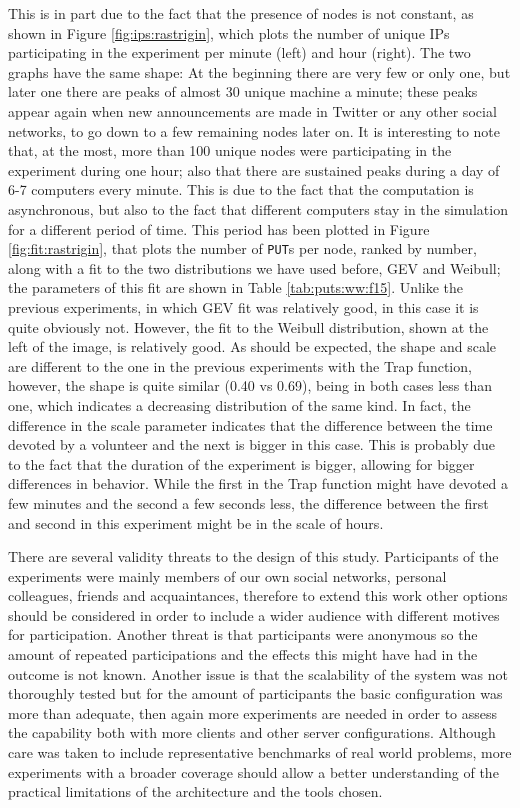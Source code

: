 \documentclass[journal,onecolumn]{IEEEtran}
\begin{document}
This is in part due to the fact that the presence of nodes is not
constant, as shown in Figure \ref{fig:ips:rastrigin}, which plots the
number of unique IPs participating in the experiment per minute (left)
and hour (right). The two graphs have the same shape: At the beginning there are very few or only
one, but later one there are peaks of almost 30 unique machine a
minute; these peaks appear again when new announcements are made in
Twitter or any other social networks, to go down to a few remaining
nodes later on. It is interesting to note that, at the most, more than
100 unique nodes were participating in the experiment during one hour;
also that there are sustained peaks during a day of 6-7 computers
every minute. This is due to the fact that the computation is
asynchronous, but also to the fact that different computers stay in
the simulation for a different period of time. This period has been
plotted in Figure \ref{fig:fit:rastrigin}, that plots the number of
{\tt PUT}s per node, ranked by number, along with a fit to the two
distributions we have used before, GEV and Weibull; the parameters of
this fit are shown in Table \ref{tab:puts:ww:f15}. Unlike the previous
experiments, in which GEV fit was relatively good, in this case it is
quite obviously not. However, the fit to the Weibull distribution,
shown at the left of the image, is relatively good. As should be
expected, the shape and scale are different to the one in the previous
experiments with the Trap function, however, the shape is quite
similar (0.40 vs 0.69), being in both cases less than one, which
indicates a decreasing distribution of the same kind. In fact, the
difference in the scale parameter indicates that the difference
between the time devoted by a volunteer and the next is bigger in this
case. This is probably due to the fact that the duration of the
experiment is bigger, allowing for bigger differences in
behavior. While the first in the Trap function might have devoted a
few minutes and the second a few seconds less, the difference between
the first and second in this experiment might be in the scale of
hours. 

There are several validity threats to the design of this study.
Participants of the experiments were mainly members of our 
own social networks, personal colleagues, friends 
and acquaintances, therefore to extend this work other options 
should be considered in order to include 
a wider audience with different motives for participation.
Another threat is that participants were anonymous so the amount of repeated 
participations and the effects this might have had in the outcome is not
known. Another issue is that the scalability of the system was not thoroughly tested
but for the amount of participants the basic configuration 
was more than adequate, then again more experiments are needed in order
to assess the capability both with more clients and other server
configurations. Although care was taken to include representative benchmarks
of real world problems, more experiments with a broader coverage 
should allow a better understanding of the practical limitations of
the architecture and the tools chosen.
\end{document}
